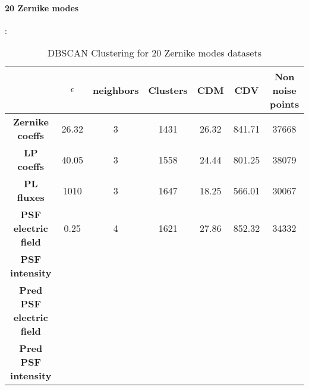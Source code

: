 		\paragraph{20 Zernike modes}:
		\begin{table}[h!]
			\centering
			\begin{tabular}{|c|c|c|c|c|c|c|}
				\hline
				\textbf{} & \textbf{$\epsilon$} & \textbf{neighbors} & \textbf{Clusters} & \textbf{CDM} & \textbf{CDV} & \textbf{Non noise points}\\
				\hline
				\textbf{Zernike coeffs} & 26.32 & 3 & 1431 & 26.32 & 841.71 & 37668 \\
				\hline
				\textbf{LP coeffs} & 40.05 & 3 & 1558 & 24.44 & 801.25 & 38079 \\
				\hline
				\textbf{PL fluxes} & 1010 & 3 & 1647 & 18.25 & 566.01 & 30067 \\
				\hline
				\textbf{PSF electric field} & 0.25 & 4 & 1621 & 27.86 & 852.32 & 34332 \\
				\hline
				\textbf{PSF intensity} &  &  &  &  &  &  \\
				\hline
				\textbf{Pred PSF electric field} &  &  &  &  &  &  \\
				\hline
				\textbf{Pred PSF intensity} &  &  &  &  &  &  \\
				\hline
			\end{tabular}
		\caption{DBSCAN Clustering for 20 Zernike modes datasets}
		\end{table}
		\FloatBarrier
		
		
	